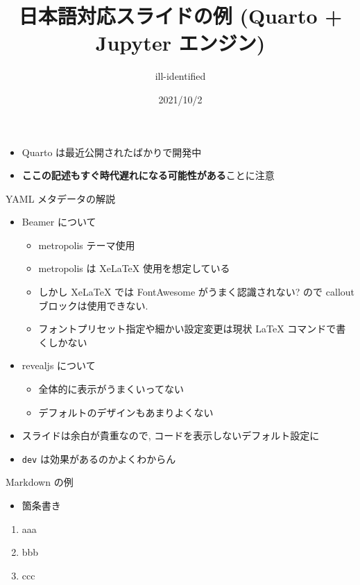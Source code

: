 \documentclass[
  ignorenonframetext,
]{beamer}
\title{日本語対応スライドの例 (Quarto + Jupyter エンジン)}
\author{ill-identified}
\date{2021/10/2}
\providecommand{\tightlist}{%
  \setlength{\itemsep}{0pt}\setlength{\parskip}{0pt}}
\begin{document}
\frame{\titlepage}

\begin{frame}{}
\protect\hypertarget{section}{}
\begin{itemize}
\tightlist
\item
  Quarto は最近公開されたばかりで開発中
\item
  \textbf{ここの記述もすぐ時代遅れになる可能性がある}ことに注意
\end{itemize}
\end{frame}

\begin{frame}[fragile]{YAML メタデータの解説}
\protect\hypertarget{yaml-ux30e1ux30bfux30c7ux30fcux30bfux306eux89e3ux8aac}{}
\begin{itemize}
\tightlist
\item
  Beamer について

  \begin{itemize}
  \tightlist
  \item
    metropolis テーマ使用
  \item
    metropolis は XeLaTeX 使用を想定している
  \item
    しかし XeLaTeX では FontAwesome がうまく認識されない? ので callout
    ブロックは使用できない.
  \item
    フォントプリセット指定や細かい設定変更は現状 LaTeX
    コマンドで書くしかない
  \end{itemize}
\item
  revealjs について

  \begin{itemize}
  \tightlist
  \item
    全体的に表示がうまくいってない
  \item
    デフォルトのデザインもあまりよくない
  \end{itemize}
\item
  スライドは余白が貴重なので, コードを表示しないデフォルト設定に
\item
  \texttt{dev} は効果があるのかよくわからん
\end{itemize}
\end{frame}

\begin{frame}{Markdown の例}
\protect\hypertarget{markdown-ux306eux4f8b}{}
\begin{itemize}
\tightlist
\item
  箇条書き
\end{itemize}

\begin{enumerate}
\tightlist
\item
  aaa
\item
  bbb
\item
  ccc
\end{enumerate}
\end{frame}
\end{document}
